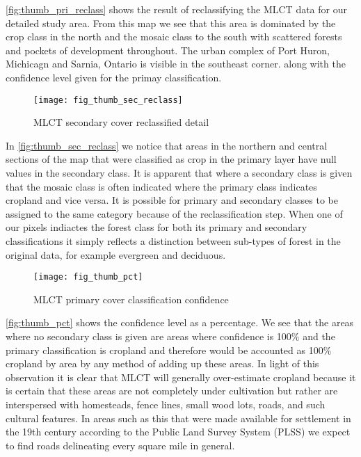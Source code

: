 
\autoref{fig:thumb_pri_reclass} shows the result of reclassifying the MLCT data
for our detailed study area.  From this map we see that this area is
dominated by the crop class in the north and the mosaic class to the
south with scattered forests and pockets of development throughout.
The urban complex of Port Huron, Michicagn and Sarnia, Ontario is
visible in the southeast corner.  along with the confidence level given for
the primay classification.

\begin{figure}[hpt] 
\begin{center}
  

\texttt{[image: fig\_thumb\_sec\_reclass]}
\end{center} 
\caption{MLCT secondary cover reclassified detail} 
\label{fig:thumb_sec_reclass} 
\end{figure} 


In \autoref{fig:thumb_sec_reclass} we notice that areas in the
northern and central sections of the map that were classified as crop
in the primary layer have null values in the secondary class.  It is
apparent that where a secondary class is given that the mosaic class
is often indicated where the primary class indicates cropland and vice
versa.  It is possible for primary and secondary classes to be
assigned to the same category because of the reclassification step.
When one of our pixels indiactes the forest class for both its primary
and secondary classifications it simply reflects a distinction between
sub-types of forest in the original data, for example evergreen and
deciduous.

\begin{figure}[hpt] 
\begin{center}
  

\texttt{[image: fig\_thumb\_pct]}
\end{center} 
\caption{MLCT primary cover classification confidence} 
\label{fig:thumb_pct} 
\end{figure} 

\autoref{fig:thumb_pct} shows the confidence level as a percentage.
We see that the areas where no secondary class is given are areas
where confidence is 100\% and the primary classification is cropland
and therefore would be accounted as 100\% cropland by area by any
method of adding up these areas.  In light of this observation it is
clear that MLCT will generally over-estimate cropland because it is
certain that these areas are not completely under cultivation but
rather are interspersed with homesteads, fence lines, small wood lots,
roads, and such cultural features.  In areas such as this that were
made available for settlement in the 19th century according to the
Public Land Survey System (PLSS) we expect to find roads delineating
every square mile in general.  


